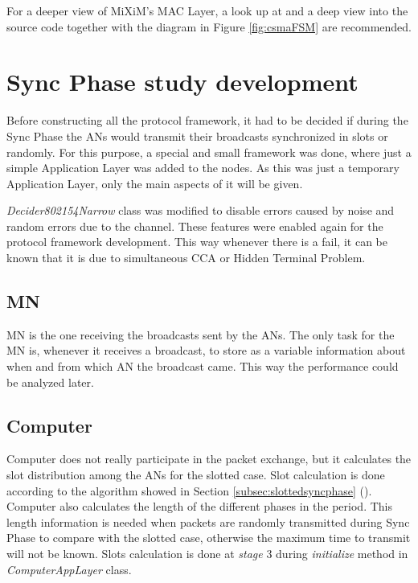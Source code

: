 For a deeper view of \ac{MiXiM}'s \ac{MAC} Layer, a look up at \cite{MiXiM} and a deep view into the source code together with the diagram in Figure 
\ref{fig:csmaFSM} are recommended.


\section{Sync Phase study development}

Before constructing all the protocol framework, it had to be decided if during the Sync Phase the \acp{AN} would transmit their broadcasts 
synchronized in slots or randomly. For this purpose, a special and small framework was done, where just a simple Application Layer was added to 
the nodes. As this was just a temporary Application Layer, only the main aspects of it will be given.

\textit{Decider802154Narrow} class was modified to disable errors caused by noise and random errors due to the channel. These features were 
enabled again for the protocol framework development. This way whenever there is a fail, it can be known that it is due to simultaneous \ac{CCA}
or Hidden Terminal Problem.

\subsection{\ac{MN}}

\ac{MN} is the one receiving the broadcasts sent by the \acp{AN}. The only task for the \ac{MN} is, whenever it receives a broadcast, to
store as a variable information about when and from which \ac{AN} the broadcast came. This way the performance could be analyzed later.

\subsection{Computer}

Computer does not really participate in the packet exchange, but it calculates the slot distribution among the \acp{AN} for the slotted case. 
Slot calculation is done according to the algorithm showed in Section \ref{subsec:slottedsyncphase} (). Computer 
also calculates the length of the different phases in the period. This length information is needed when packets are randomly transmitted 
during Sync Phase to compare with the slotted case, otherwise the maximum time to transmit will not be known. Slots calculation is done at
\textit{stage} 3 during \textit{initialize} method in \textit{ComputerAppLayer} class.

